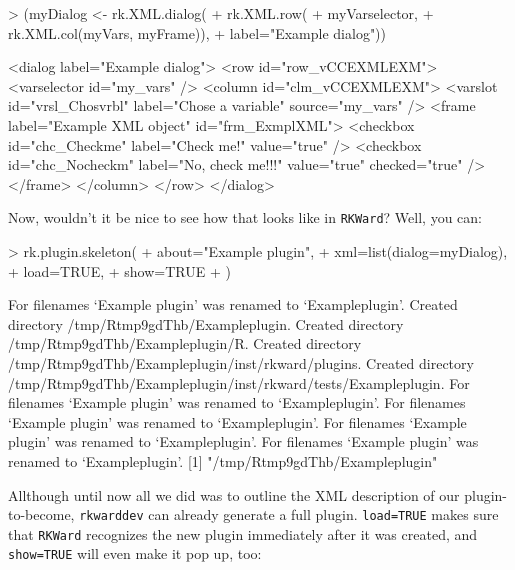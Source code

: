 \documentclass[a4paper,10pt]{scrartcl}
\begin{document}
	\begin{Schunk}
		\begin{Sinput}
> (myDialog <- rk.XML.dialog(
+   rk.XML.row(
+     myVarselector,
+     rk.XML.col(myVars, myFrame)),
+   label="Example dialog"))
		\end{Sinput}
		\begin{Soutput}
<dialog label="Example dialog">
  <row id="row_vCCEXMLEXM">
    <varselector id="my_vars" />
    <column id="clm_vCCEXMLEXM">
      <varslot id="vrsl_Chosvrbl" label="Chose a variable" source="my_vars" />
      <frame label="Example XML object" id="frm_ExmplXML">
        <checkbox id="chc_Checkme" label="Check me!" value="true" />
        <checkbox id="chc_Nocheckm" label="No, check me!!!" value="true" checked="true" />
      </frame>
    </column>
  </row>
</dialog>
		\end{Soutput}
	\end{Schunk}

Now, wouldn't it be nice to see how that looks like in \texttt{RKWard}? Well, you can:

	\begin{Schunk}
		\begin{Sinput}
> rk.plugin.skeleton(
+   about="Example plugin",
+   xml=list(dialog=myDialog),
+   load=TRUE,
+   show=TRUE
+ )
		\end{Sinput}
		\begin{Soutput}
For filenames ‘Example plugin’ was renamed to ‘Exampleplugin’.
Created directory /tmp/Rtmp9gdThb/Exampleplugin.
Created directory /tmp/Rtmp9gdThb/Exampleplugin/R.
Created directory /tmp/Rtmp9gdThb/Exampleplugin/inst/rkward/plugins.
Created directory /tmp/Rtmp9gdThb/Exampleplugin/inst/rkward/tests/Exampleplugin.
For filenames ‘Example plugin’ was renamed to ‘Exampleplugin’.
For filenames ‘Example plugin’ was renamed to ‘Exampleplugin’.
For filenames ‘Example plugin’ was renamed to ‘Exampleplugin’.
For filenames ‘Example plugin’ was renamed to ‘Exampleplugin’.
[1] "/tmp/Rtmp9gdThb/Exampleplugin"
		\end{Soutput}
	\end{Schunk}

Allthough until now all we did was to outline the XML description of our plugin-to-become, \texttt{rkwarddev}
can already generate a full plugin. \texttt{load=TRUE} makes sure that \texttt{RKWard} recognizes the new plugin
immediately after it was created, and \texttt{show=TRUE} will even make it pop up, too:
\end{document}
